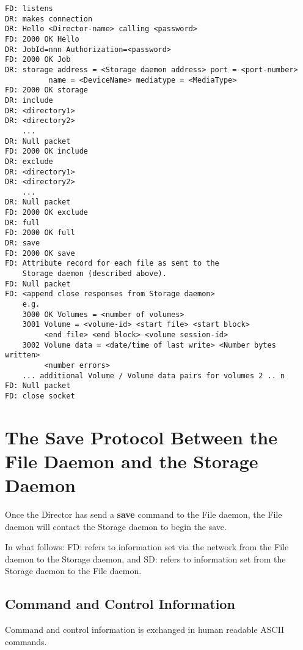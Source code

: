 \footnotesize
\begin{verbatim}
FD: listens
DR: makes connection
DR: Hello <Director-name> calling <password>
FD: 2000 OK Hello
DR: JobId=nnn Authorization=<password>
FD: 2000 OK Job
DR: storage address = <Storage daemon address> port = <port-number>
          name = <DeviceName> mediatype = <MediaType>
FD: 2000 OK storage
DR: include
DR: <directory1>
DR: <directory2>
    ...
DR: Null packet
FD: 2000 OK include
DR: exclude
DR: <directory1>
DR: <directory2>
    ...
DR: Null packet
FD: 2000 OK exclude
DR: full
FD: 2000 OK full
DR: save
FD: 2000 OK save
FD: Attribute record for each file as sent to the
    Storage daemon (described above).
FD: Null packet
FD: <append close responses from Storage daemon>
    e.g.
    3000 OK Volumes = <number of volumes>
    3001 Volume = <volume-id> <start file> <start block>
         <end file> <end block> <volume session-id>
    3002 Volume data = <date/time of last write> <Number bytes written>
         <number errors>
    ... additional Volume / Volume data pairs for volumes 2 .. n
FD: Null packet
FD: close socket
\end{verbatim}
\normalsize

\section{The Save Protocol Between the File Daemon and the Storage Daemon}

Once the Director has send a {\bf save} command to the File daemon, the File
daemon will contact the Storage daemon to begin the save.

In what follows: FD: refers to information set via the network from the File
daemon to the Storage daemon, and SD: refers to information set from the
Storage daemon to the File daemon.

\subsection{Command and Control Information}

Command and control information is exchanged in human readable ASCII commands.


